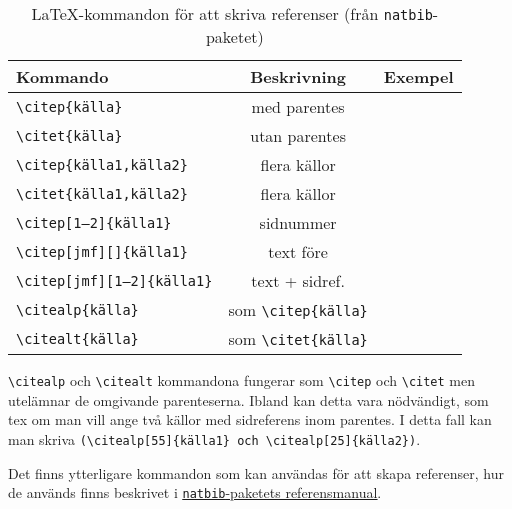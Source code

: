 \begin{table}[ht]
  \centering
  \renewcommand{\arraystretch}{1.25}%
  \begin{tabular}[t]{lcc}
    \toprule
    {\sffamily\textbf{Kommando}} &
    {\sffamily\textbf{Beskrivning}} &
    {\sffamily\textbf{Exempel}} \\
    \midrule
    \texttt{\textbackslash{}citep\{källa\}} &
    med parentes &
    \citep{bergman+wallin-2001} \\
    \texttt{\textbackslash{}citet\{källa\}} &
    utan parentes &
    \citet{bergman+wallin-2001} \\
    \midrule
    \texttt{\textbackslash{}citep\{källa1,källa2\}} &
    flera källor &
    \citep{bergman+wallin-2001,bergman-1977} \\
    \texttt{\textbackslash{}citet\{källa1,källa2\}} &
    flera källor &
    \citet{bergman+wallin-2001,bergman-1977} \\
    \midrule
    \texttt{\textbackslash{}citep[1--2]\{källa1\}} &
    sidnummer &
    \citep[1--2]{bergman-1977} \\
    \texttt{\textbackslash{}citep[jmf][]\{källa1\}} &
    text före &
    \citep[jmf][]{bergman-1977} \\
    \texttt{\textbackslash{}citep[jmf][1--2]\{källa1\}} &
    text + sidref. &
    \citep[jmf][1--2]{bergman-1977} \\
    \midrule
    \texttt{\textbackslash{}citealp\{källa\}} &
    som \texttt{\textbackslash{}citep\{källa\}} &
    \citealp{bergman+wallin-2001} \\
    \texttt{\textbackslash{}citealt\{källa\}} &
    som \texttt{\textbackslash{}citet\{källa\}} &
    \citealt{bergman+wallin-2001} \\
    \bottomrule
  \end{tabular}
  \caption{\LaTeX-kommandon för att skriva referenser (från \texttt{natbib}-paketet)}
\end{table}

\texttt{\textbackslash{}citealp} och \texttt{\textbackslash{}citealt}
kommandona fungerar som \texttt{\textbackslash{}citep} och
\texttt{\textbackslash{}citet} men utelämnar de omgivande parenteserna. Ibland
kan detta vara nödvändigt, som tex om man vill ange två källor med sidreferens
inom parentes. I detta fall kan man skriva
\texttt{(\textbackslash{}citealp[55]\{källa1\} och
  \textbackslash{}citealp[25]\{källa2\})}.

Det finns ytterligare kommandon som kan användas för att skapa referenser, hur
de används finns beskrivet i
\underline{\href{http://ftp.acc.umu.se/mirror/CTAN/macros/latex/contrib/natbib/natbib.pdf}{\texttt{natbib}-paketets referensmanual}}.


